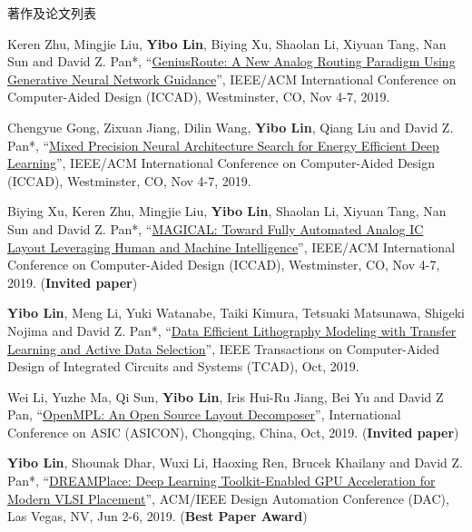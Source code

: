 \begin{rSection}{著作及论文列表}
\begin{description}[font=\normalfont, rightmargin=2em]
{}
            

\item[{[C47]}]{
        Keren Zhu, Mingjie Liu, \textbf{Yibo Lin}, Biying Xu, Shaolan Li, Xiyuan Tang, Nan Sun and David Z. Pan*, 
    ``\href{https://doi.org/10.1109/ICCAD45719.2019.8942164}{GeniusRoute: A New Analog Routing Paradigm Using Generative Neural Network Guidance}'', 
    IEEE/ACM International Conference on Computer-Aided Design (ICCAD), Westminster, CO, Nov 4-7, 2019.
    
}
            

\item[{[C46]}]{
        Chengyue Gong, Zixuan Jiang, Dilin Wang, \textbf{Yibo Lin}, Qiang Liu and David Z. Pan*, 
    ``\href{https://doi.org/10.1109/ICCAD45719.2019.8942147}{Mixed Precision Neural Architecture Search for Energy Efficient Deep Learning}'', 
    IEEE/ACM International Conference on Computer-Aided Design (ICCAD), Westminster, CO, Nov 4-7, 2019.
    
}
            

\item[{[C45]}]{
        Biying Xu, Keren Zhu, Mingjie Liu, \textbf{Yibo Lin}, Shaolan Li, Xiyuan Tang, Nan Sun and David Z. Pan*, 
    ``\href{https://doi.org/10.1109/ICCAD45719.2019.8942060}{MAGICAL: Toward Fully Automated Analog IC Layout Leveraging Human and Machine Intelligence}'', 
    IEEE/ACM International Conference on Computer-Aided Design (ICCAD), Westminster, CO, Nov 4-7, 2019.
    (\textbf{Invited paper})
}
            

\item[{[J44]}]{
        \textbf{Yibo Lin}, Meng Li, Yuki Watanabe, Taiki Kimura, Tetsuaki Matsunawa, Shigeki Nojima and David Z. Pan*, 
    ``\href{https://doi.org/10.1109/TCAD.2018.2864251}{Data Efficient Lithography Modeling with Transfer Learning and Active Data Selection}'', 
    IEEE Transactions on Computer-Aided Design of Integrated Circuits and Systems (TCAD), Oct, 2019.
    
}
            

\item[{[C43]}]{
        Wei Li, Yuzhe Ma, Qi Sun, \textbf{Yibo Lin}, Iris Hui-Ru Jiang, Bei Yu and David Z Pan, 
    ``\href{https://arxiv.org/abs/1809.07554}{OpenMPL: An Open Source Layout Decomposer}'', 
    International Conference on ASIC (ASICON), Chongqing, China, Oct, 2019.
    (\textbf{Invited paper})
}
            

\item[{[C42]}]{
        \textbf{Yibo Lin}, Shounak Dhar, Wuxi Li, Haoxing Ren, Brucek Khailany and David Z. Pan*, 
    ``\href{https://doi.org/10.1145/3316781.3317803}{DREAMPlace: Deep Learning Toolkit-Enabled GPU Acceleration for Modern VLSI Placement}'', 
    ACM/IEEE Design Automation Conference (DAC), Las Vegas, NV, Jun 2-6, 2019.
    (\textbf{Best Paper Award})
}
            


\end{description}
\end{rSection}
